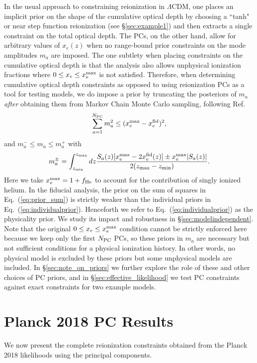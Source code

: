 \documentclass[aps,prd,twocolumn,amsmath,amssymb,showpacs,floatfix,superscriptaddress,nofootinbib]{revtex4-1}
\begin{document}
In the usual approach to constraining reionization in $\Lambda$CDM, one places an implicit prior on the shape of the cumulative optical depth by choosing a ``tanh" or near step function reionization (see \S \ref{sec:example1}) and then extracts a single constraint on the total optical depth.
The PCs, on the other hand, allow for arbitrary values of $x_e(z)$ when no range-bound prior constraints on the mode amplitudes $m_a$ are imposed. The one subtlety when placing constraints on the cumulative optical depth is that the analysis also allows
unphysical ionization fractions where $0 \le x_e \le x_e^{\rm max}$  is not satisfied.
Therefore, when determining cumulative optical depth constraints as opposed to using reionization PCs as a tool for testing models,
 we do impose a  prior
 by truncating the posteriors of $m_a$
 {\it after} obtaining them from Markov Chain Monte Carlo sampling, following Ref.~\cite{Mortonson:2008rx}
%
\begin{equation}
\sum_{a=1}^{N_{\rm PC}} m_a^2 \le (x_e^{\rm max}-x_e^{\rm fid})^2,
\label{eq:prior_sum}
\end{equation}
and 
$m_a^{-} \le m_a \le m_a^{+}$ with
\begin{equation}
m_a^{\pm} = \int_{z_{\rm min}}^{z_{\rm max} } dz \frac{S_a(z)[x_e^{\rm max} -2 x_e^{\rm fid}(z)]
\pm x_e^{\rm max} | S_a(z)|}{2(z_{\rm max}-z_{\rm min})}.
\label{eq:individualprior}
\end{equation}
Here we take $x_e^{\rm max} = 1+ f_{\rm He} $ to account for the contribution of singly ionized helium.
In the fiducial analysis, the prior on the sum of squares in Eq.~(\ref{eq:prior_sum}) is strictly weaker than the individual priors in Eq.~(\ref{eq:individualprior}).
Henceforth we refer to Eq.~(\ref{eq:individualprior}) as the physicality prior.  We study its impact and robustness in \S \ref{sec:modelindependent}.
%
Note that the original $0\le x_e \le x_e^{\rm max}$ condition cannot be strictly enforced here because we  keep only the first $N_{\rm PC}$ PCs, so these priors in $m_a$ are necessary but not sufficient conditions for a physical ionization history.  
In other words, no physical model is excluded by these priors but some unphysical models are included.  In \S \ref{sec:note_on_priors} we further explore the role of these and other choices of PC priors, and in \S\ref{sec:effective_likelihood} we test PC constraints against exact constraints for two example models.  



\section{Planck 2018 PC Results}
\label{sec:results}
We now present the complete reionization constraints obtained from the Planck 2018 likelihoods using the principal components.
\end{document}
